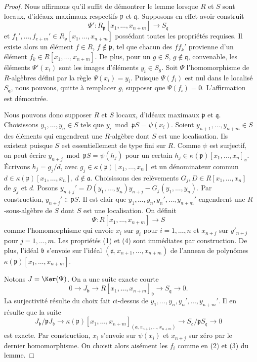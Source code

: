 \begin{proof}
Nous affirmons qu'il suffit de démontrer le lemme lorsque $R$
et $S$ sont locaux, d'idéaux maximaux respectifs $\mathfrak p$ et $\mathfrak q$.
Supposons en effet avoir construit
$$
\Psi' : R_{\mathfrak p}[x_1, \ldots, x_{n + m}]
\longrightarrow
S_{\mathfrak q}
$$
et $f_1', \ldots, f_{e + m}' \in R_{\mathfrak p}[x_1, \ldots, x_{n + m}]$
possédant toutes les propriétés requises. Il existe alors un élément
$f \in R$, $f \not \in \mathfrak p$, tel que chacun des
$ff_k'$ provienne d'un élément $f_k \in R[x_1, \ldots, x_{n + m}]$.
De plus, pour un $g \in S$, $g \not \in \mathfrak q$, convenable,
les éléments $\Psi'(x_i)$ sont les images d'éléments
$y_i \in S_g$. Soit $\Psi$ l'homomorphisme de $R$-algèbres défini
par la règle $\Psi(x_i) = y_i$. Puisque $\Psi(f_i)$ est nul
dans le localisé $S_{\mathfrak q}$, nous pouvons, quitte à remplacer
$g$, supposer que $\Psi(f_i) = 0$. L'affirmation est démontrée.

\medskip\noindent
Nous pouvons donc supposer $R$ et $S$ locaux,
d'idéaux maximaux $\mathfrak p$ et $\mathfrak q$.
Choisissons $y_1, \ldots, y_n \in S$ tels que
$y_i \bmod \mathfrak pS = \psi(x_i)$.
Soient $y_{n + 1}, \ldots, y_{n + m} \in S$ des éléments qui engendrent
une $R$-algèbre dont $S$ est une localisation.
Ils existent puisque $S$ est essentiellement de type fini sur $R$.
Comme $\psi$ est surjectif, on peut écrire
$y_{n + j} \bmod \mathfrak pS = \psi(h_j)$ pour
un certain $h_j \in \kappa(\mathfrak p)[x_1, \ldots, x_n]_{\mathfrak a}$.
Écrivons $h_j = g_j/d$, avec $g_j \in \kappa(\mathfrak p)[x_1, \ldots, x_n]$
et un dénominateur commun $d \in \kappa(\mathfrak p)[x_1, \ldots, x_n]$,
$d \not \in \mathfrak a$. Choisissons des relèvements
$G_j, D \in R[x_1, \ldots, x_n]$ de $g_j$ et $d$. Posons
$y_{n + j}' = D(y_1, \ldots, y_n) y_{n + j} - G_j(y_1, \ldots, y_n)$.
Par construction, $y_{n + j}' \in \mathfrak p S$.
Il est clair que $y_1, \ldots, y_n, y_n', \ldots, y_{n + m}'$
engendrent une $R$-sous-algèbre de $S$ dont $S$ est une localisation.
On définit
$$
\Psi : R[x_1, \ldots, x_{n + m}] \to S
$$
comme l'homomorphisme qui envoie $x_i$ sur $y_i$ pour $i = 1, \ldots, n$
et $x_{n + j}$ sur $y'_{n + j}$ pour $j = 1, \ldots, m$. Les propriétés
(1) et (4) sont immédiates par construction. De plus, l'idéal
$\mathfrak b$ s'envoie sur l'idéal
$(\mathfrak a, x_{n + 1}, \ldots, x_{n + m})$
de l'anneau de polynômes $\kappa(\mathfrak p)[x_1, \ldots, x_{n + m}]$.

\medskip\noindent
Notons $J = \Ker(\Psi)$. On a une suite exacte courte
$$
0 \to J_{\mathfrak b}
\to R[x_1, \ldots, x_{n + m}]_{\mathfrak b}
\to S_{\mathfrak q}
\to 0.
$$
La surjectivité résulte du choix fait ci-dessus de
$y_1, \ldots, y_n, y_n', \ldots, y_{n + m}'$.
Il en résulte que la suite
$$
J_{\mathfrak b}/ \mathfrak pJ_{\mathfrak b}
\to \kappa(\mathfrak p)[x_1, \ldots, x_{n + m}]_{
(\mathfrak a, x_{n + 1}, \ldots, x_{n + m})}
\to S_{\mathfrak q}/\mathfrak pS_{\mathfrak q}
\to 0
$$
est exacte. Par construction, $x_i$ s'envoie sur $\psi(x_i)$ et
$x_{n + j}$ sur zéro par le dernier homomorphisme.
On choisit alors aisément les $f_i$ comme en
(2) et (3) du lemme.
\end{proof}

